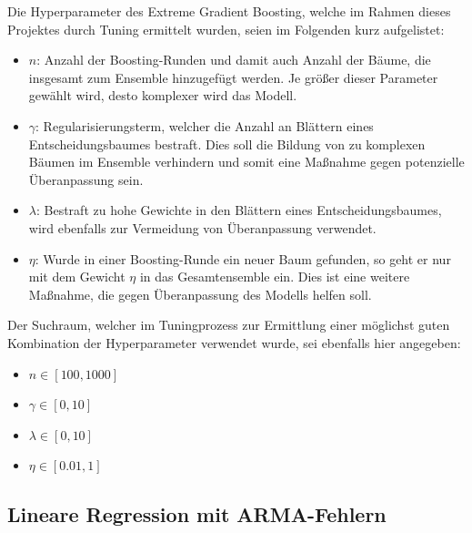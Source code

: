 Die Hyperparameter des Extreme Gradient Boosting, welche im Rahmen dieses Projektes durch Tuning
ermittelt wurden, seien im Folgenden kurz aufgelistet:
\begin{itemize}
    \item $n$: Anzahl der Boosting-Runden und damit auch Anzahl der B\"aume, die insgesamt zum Ensemble hinzugef\"ugt werden.
        Je gr\"o{\ss}er dieser Parameter gew\"ahlt wird, desto komplexer wird das Modell.
    \item $\gamma$: Regularisierungsterm, welcher die Anzahl an Bl\"attern eines Entscheidungsbaumes bestraft.
        Dies soll die Bildung von zu komplexen B\"aumen im Ensemble verhindern und somit eine Ma{\ss}nahme gegen potenzielle
        \"Uberanpassung sein.
    \item $\lambda$: Bestraft zu hohe Gewichte in den Bl\"attern eines Entscheidungsbaumes, wird ebenfalls zur Vermeidung von
        \"Uberanpassung verwendet.
    \item $\eta$: Wurde in einer Boosting-Runde ein neuer Baum gefunden, so geht er nur mit dem Gewicht $\eta$ in das 
        Gesamtensemble ein. Dies ist eine weitere Ma{\ss}nahme, die gegen \"Uberanpassung des Modells helfen soll.
\end{itemize}
Der Suchraum, welcher im Tuningprozess zur Ermittlung einer m\"oglichst guten Kombination der Hyperparameter verwendet wurde, 
sei ebenfalls hier angegeben:
\begin{itemize}
    \item $n \in \left[100, 1000 \right]$
    \item $\gamma \in \left[0, 10 \right]$
    \item $\lambda \in \left[0, 10 \right]$
    \item $\eta \in \left[0.01, 1 \right]$
\end{itemize}

\subsection{Lineare Regression mit ARMA-Fehlern}
\label{sec:arma}

